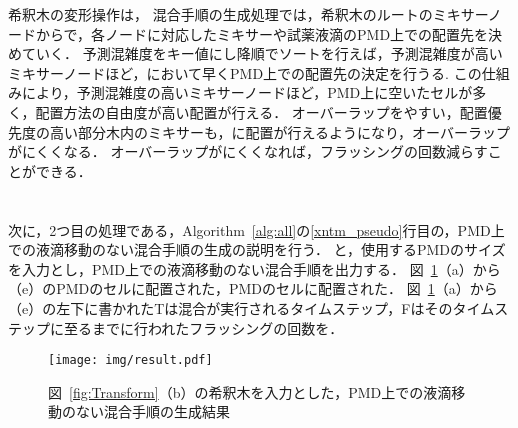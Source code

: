 希釈木の変形操作は，
混合手順の生成処理では，希釈木のルートのミキサーノードからで，各ノードに対応したミキサーや試薬液滴のPMD上での配置先を決めていく．
予測混雑度をキー値にし降順でソートを行えば，予測混雑度が高いミキサーノードほど，において早くPMD上での配置先の決定を行うる.
この仕組みにより，予測混雑度の高いミキサーノードほど，PMD上に空いたセルが多く，配置方法の自由度が高い配置が行える．
オーバーラップをやすい，配置優先度の高い部分木内のミキサーも，に配置が行えるようになり，オーバーラップがにくくなる．
オーバーラップがにくくなれば，フラッシングの回数減らすことができる．





\section{}
次に，2つ目の処理である，Algorithm~\ref{alg:all}の\ref{xntm_pseudo}行目の，PMD上での液滴移動のない混合手順の生成の説明を行う．
と，使用するPMDのサイズを入力とし，PMD上での液滴移動のない混合手順を出力する．
図~\ref{fig:result}（a）から（e）のPMDのセルに配置された，PMDのセルに配置された．
図~\ref{fig:result}（a）から（e）の左下に書かれたTは混合が実行されるタイムステップ，Fはそのタイムステップに至るまでに行われたフラッシングの回数を．

\begin{figure}[tbp]
 \centering\texttt{[image: img/result.pdf]}
    \caption{図~\ref{fig:Transform}（b）の希釈木を入力とした，PMD上での液滴移動のない混合手順の生成結果}\label{fig:result}
\end{figure}



